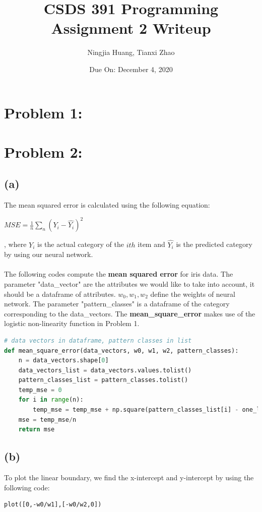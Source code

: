 \documentclass[12pt]{article}
\begin{document}
\title{CSDS 391 Programming Assignment 2 Writeup}
\author{Ningjia Huang, Tianxi Zhao}
\date{Due On: December 4, 2020}
\maketitle

\section*{Problem 1: }

\section*{Problem 2: }
\subsection*{(a)}
The mean squared error is calculated using the following equation: 
\begin{center}
    $MSE = \frac{1}{n}\sum_n (Y_i - \hat{Y_i})^2$
\end{center}
, where $Y_i$ is the actual category of the $ith$ item and $\hat{Y_i}$ is the predicted category by using our neural network.\\ \\
The following codes compute the \textbf{mean squared error} for iris data. The parameter "data\_vector" are the attributes we would like to take into account, it should be a dataframe of attributes.
$w_0, w_1, w_2$ define the weights of neural network. The parameter "pattern\_classes" is a dataframe of the category corresponding to the data\_vectors. The \textbf{mean\_square\_error} makes use of 
the logistic non-linearity function in Problem 1.
\begin{lstlisting}[language=Python, caption=Mean Squared Error Calculation]
# data vectors in dataframe, pattern classes in list
def mean_square_error(data_vectors, w0, w1, w2, pattern_classes):
    n = data_vectors.shape[0]
    data_vectors_list = data_vectors.values.tolist()
    pattern_classes_list = pattern_classes.tolist()
    temp_mse = 0
    for i in range(n):
        temp_mse = temp_mse + np.square(pattern_classes_list[i] - one_layer_network(w0, w1, w2, data_vectors_list[i][0], data_vectors_list[i][1]))
    mse = temp_mse/n
    return mse
\end{lstlisting}

\subsection*{(b)}
To plot the linear boundary, we find the x-intercept and y-intercept by using the following code: 
\begin{lstlisting}
plot([0,-w0/w1],[-w0/w2,0])
\end{lstlisting}
\end{document}
